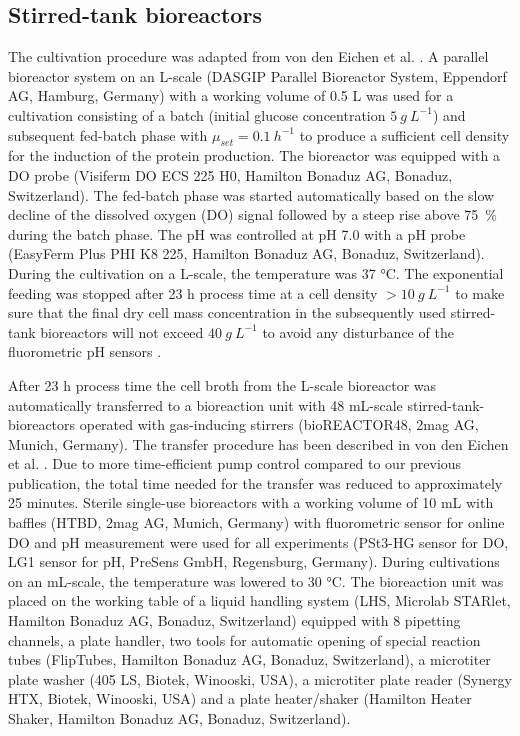 \documentclass[sn-standardnature]{sn-jnl}%
\theoremstyle{thmstyleone}%
\theoremstyle{thmstyletwo}%
\theoremstyle{thmstylethree}%
\begin{document}
\subsection{Stirred-tank bioreactors}
The cultivation procedure was adapted from von den Eichen et al. \cite{von2021automated}.
A parallel bioreactor system on an L-scale (DASGIP Parallel Bioreactor System, Eppendorf AG, Hamburg, Germany) with a working volume of 0.5 L was used for a cultivation consisting of a batch (initial glucose concentration $5\ g\ L^{-1}$) and subsequent fed-batch phase with $\mu_{set} = 0.1\ h^{-1}$ to produce a sufficient cell density for the induction of the protein production.
The bioreactor was equipped with a DO probe (Visiferm DO ECS 225 H0, Hamilton Bonaduz AG, Bonaduz, Switzerland).
The fed-batch phase was started automatically based on the slow decline of the dissolved oxygen (DO) signal followed by a steep rise above 75~\% during the batch phase.
The pH was controlled at pH 7.0 with a pH probe (EasyFerm Plus PHI K8 225, Hamilton Bonaduz AG, Bonaduz, Switzerland).
During the cultivation on a L-scale, the temperature was 37 °C.
The exponential feeding was stopped after 23 h process time at a cell density $> 10\ g\ L^{-1}$ to make sure that the final dry cell mass concentration in the subsequently used stirred-tank bioreactors will not exceed $40\ g\ L^{-1}$ to avoid any disturbance of the fluorometric pH sensors \cite{faust2014feeding}.

After 23 h process time the cell broth from the L-scale bioreactor was automatically transferred to a bioreaction unit with 48 mL-scale stirred-tank-bioreactors operated with gas-inducing stirrers (bioREACTOR48, 2mag AG, Munich, Germany).
The transfer procedure has been described in von den Eichen et al. \cite{von2021automated}.
Due to more time-efficient pump control compared to our previous publication, the total time needed for the transfer was reduced to approximately 25 minutes.
Sterile single-use bioreactors with a working volume of 10 mL with baffles (HTBD, 2mag AG, Munich, Germany) with fluorometric sensor for online DO and pH measurement were used for all experiments (PSt3-HG sensor for DO, LG1 sensor for pH,  PreSens GmbH, Regensburg, Germany).
During cultivations on an mL-scale, the temperature was lowered to 30 °C.
The bioreaction unit was placed on the working table of a liquid handling system (LHS, Microlab STARlet, Hamilton Bonaduz AG, Bonaduz, Switzerland) equipped with 8 pipetting channels, a plate handler, two tools for automatic opening of special reaction tubes (FlipTubes, Hamilton Bonaduz AG, Bonaduz, Switzerland), a microtiter plate washer (405 LS, Biotek, Winooski, USA), a microtiter plate reader (Synergy HTX, Biotek, Winooski, USA) and a plate heater/shaker (Hamilton Heater Shaker, Hamilton Bonaduz AG, Bonaduz, Switzerland).
\end{document}
